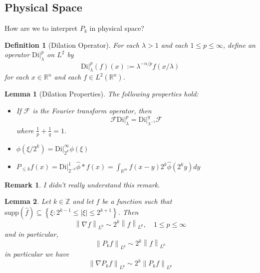 \documentclass{article}
\newtheorem{definition}{Definition}
\newtheorem{lemma}{Lemma}
\newtheorem{remark}{Remark}
\def\R{\mathbb{R}} %
\def\Z{\mathbb{Z}} %
\newcommand{\di}{\left. \mathrm{Di} \right|}
\newcommand\norm[1]{\left\lVert#1\right\rVert}
\begin{document}
\subsection{Physical Space}
How are we to interpret $P_{k}$ in physical space?
\begin{definition}[Dilation Operator]
  \label{def:dilation-operator}
  For each $\lambda>1$ and each $1 \leq p \leq \infty$, define an operator
  $\di_{\lambda}^{p}$ on $L^{2}$ by
  \begin{equation*}
    \di_{\lambda}^{p}(f)(x):= \lambda^{-n/p}f(x/\lambda)
  \end{equation*}
  for each $x\in \R^n$ and each $f\in L^{2}(\R^n)$. 
\end{definition}
\begin{lemma}[Dilation Properties]
  \label{lem:dilation-properties}
  The following properties hold:
  \begin{itemize}
    \item If $\mathcal{F}$ is the Fourier transform operator, then
    \begin{equation*}
      \mathcal{F}\di_{\lambda}^{p} = \di_{\lambda^{-1}}^{q}\mathcal{F}
    \end{equation*}
    where $\frac{1}{p}+\frac{1}{q}=1$.
    \item $\phi(\xi/2^{k})= \di_{2^{k}}^{\infty}\phi(\xi)$ 
    \item $P_{\leq k}f(x)=\di_{2^{-k}}^{1}\hat{\phi}*f(x) = \int_{\R^m}f(x-y)2^{k}\hat{\phi}(2^{k}y)dy $
  \end{itemize}
\end{lemma}
\begin{remark}
  I didn't really understand this remark. 
\end{remark}
\begin{lemma}
  \label{lem:littlewood-paley-Lp-lemma}
  Let $k\in \Z$ and let $f$ be a function such that
  $\text{supp}(\hat{f}) \subseteq \left\{\xi: 2^{k-1}\leq |\xi| \leq
    2^{k+1}\right\}$. Then
  \begin{equation*}
    \norm{\nabla f}_{L^{p}} \sim 2^{k} \norm{f}_{L^{p}}, \quad 1 \leq  p\leq \infty
  \end{equation*}
  and in particular,
  \begin{equation*}
    \norm{P_{k}f}_{L^{p}} \sim 2^{k} \norm{f}_{L^{p}}
  \end{equation*}
  in particular we have
  \begin{equation}\label{eq:8}
    \norm{\nabla P_{k}f}_{L^{p}} \sim 2^{k} \norm{P_{k}f}_{L^{p}}
  \end{equation}
\end{lemma}
\end{document}
